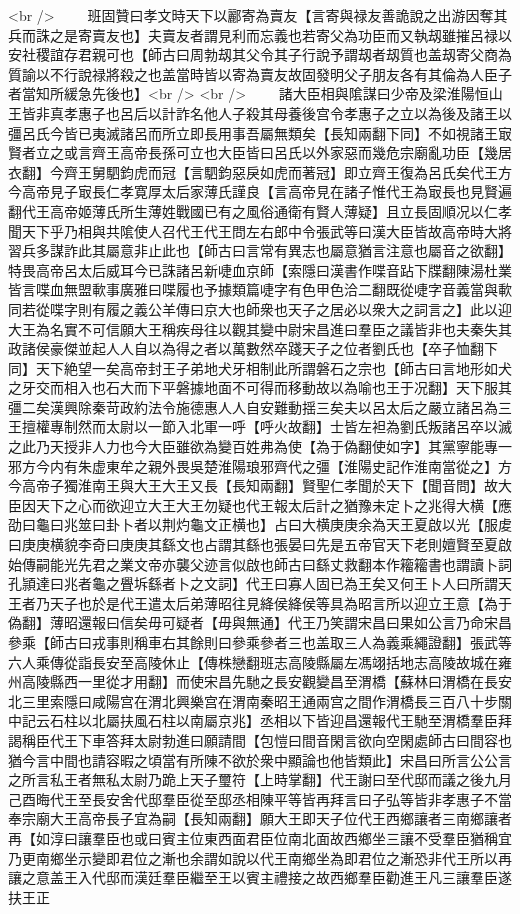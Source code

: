 <br />
　　班固贊曰孝文時天下以酈寄為賣友【言寄與禄友善詭說之出游因奪其兵而誅之是寄賣友也】夫賣友者謂見利而忘義也若寄父為功臣而又執刼雖摧呂禄以安社稷誼存君親可也【師古曰周勃刼其父令其子行說予謂刼者刼質也盖刼寄父商為質諭以不行說禄將殺之也盖當時皆以寄為賣友故固發明父子朋友各有其倫為人臣子者當知所緩急先後也】<br />
<br />
　　諸大臣相與隂謀曰少帝及梁淮陽恒山王皆非真孝惠子也呂后以計詐名他人子殺其母養後宫令孝惠子之立以為後及諸王以彊呂氏今皆已夷滅諸呂而所立即長用事吾屬無類矣【長知兩翻下同】不如視諸王㝡賢者立之或言齊王高帝長孫可立也大臣皆曰呂氏以外家惡而幾危宗廟亂功臣【幾居衣翻】今齊王舅駟鈞虎而冠【言駟鈞惡戾如虎而著冠】即立齊王復為呂氏矣代王方今高帝見子㝡長仁孝寛厚太后家薄氏謹良【言高帝見在諸子惟代王為㝡長也見賢遍翻代王高帝姬薄氏所生薄姓戰國已有之風俗通衛有賢人薄疑】且立長固順况以仁孝聞天下乎乃相與共隂使人召代王代王問左右郎中令張武等曰漢大臣皆故高帝時大將習兵多謀詐此其屬意非止此也【師古曰言常有異志也屬意猶言注意也屬音之欲翻】特畏高帝呂太后威耳今已誅諸呂新啑血京師【索隱曰漢書作喋音跕下牒翻陳湯杜業皆言喋血無盟㰱事廣雅曰喋履也予據類篇啑字有色甲色洽二翻既從啑字音義當與㰱同若從喋字則有履之義公羊傳曰京大也師衆也天子之居必以衆大之詞言之】此以迎大王為名實不可信願大王稱疾母往以觀其變中尉宋昌進曰羣臣之議皆非也夫秦失其政諸侯豪傑並起人人自以為得之者以萬數然卒踐天子之位者劉氏也【卒子恤翻下同】天下絶望一矣高帝封王子弟地犬牙相制此所謂磐石之宗也【師古曰言地形如犬之牙交而相入也石大而下平磐據地面不可得而移動故以為喻也王于况翻】天下服其彊二矣漢興除秦苛政約法令施德惠人人自安難動揺三矣夫以呂太后之嚴立諸呂為三王擅權專制然而太尉以一節入北軍一呼【呼火故翻】士皆左袒為劉氏叛諸呂卒以滅之此乃天授非人力也今大臣雖欲為變百姓弗為使【為于偽翻使如字】其黨寧能專一邪方今内有朱虚東牟之親外畏吳楚淮陽琅邪齊代之彊【淮陽史記作淮南當從之】方今高帝子獨淮南王與大王大王又長【長知兩翻】賢聖仁孝聞於天下【聞音問】故大臣因天下之心而欲迎立大王大王勿疑也代王報太后計之猶豫未定卜之兆得大横【應劭曰龜曰兆筮曰卦卜者以荆灼龜文正横也】占曰大横庚庚余為天王夏啟以光【服䖍曰庚庚横貌李奇曰庚庚其繇文也占謂其繇也張晏曰先是五帝官天下老則嬗賢至夏啟始傳嗣能光先君之業文帝亦襲父迹言似啟也師古曰繇丈救翻本作籕籕書也謂讀卜詞孔頴達曰兆者龜之舋坼繇者卜之文詞】代王曰寡人固已為王矣又何王卜人曰所謂天王者乃天子也於是代王遣太后弟薄昭往見絳侯絳侯等具為昭言所以迎立王意【為于偽翻】薄昭還報曰信矣毋可疑者【毋與無通】代王乃笑謂宋昌曰果如公言乃命宋昌參乘【師古曰戎事則稱車右其餘則曰參乘參者三也盖取三人為義乘繩證翻】張武等六人乘傳從詣長安至高陵休止【傳株戀翻班志高陵縣屬左馮翊括地志高陵故城在雍州高陵縣西一里從才用翻】而使宋昌先馳之長安觀變昌至渭橋【蘇林曰渭橋在長安北三里索隱曰咸陽宫在渭北興樂宫在渭南秦昭王通兩宫之間作渭橋長三百八十步關中記云石柱以北屬扶風石柱以南屬京兆】丞相以下皆迎昌還報代王馳至渭橋羣臣拜謁稱臣代王下車答拜太尉勃進曰願請間【包愷曰間音閑言欲向空閑處師古曰間容也猶今言中間也請容暇之頃當有所陳不欲於衆中顯論也他皆類此】宋昌曰所言公公言之所言私王者無私太尉乃跪上天子璽符【上時掌翻】代王謝曰至代邸而議之後九月己酉晦代王至長安舍代邸羣臣從至邸丞相陳平等皆再拜言曰子弘等皆非孝惠子不當奉宗廟大王高帝長子宜為嗣【長知兩翻】願大王即天子位代王西鄉讓者三南鄉讓者再【如淳曰讓羣臣也或曰賓主位東西面君臣位南北面故西鄉坐三讓不受羣臣猶稱宜乃更南鄉坐示變即君位之漸也余謂如說以代王南鄉坐為即君位之漸恐非代王所以再讓之意盖王入代邸而漢廷羣臣繼至王以賓主禮接之故西鄉羣臣勸進王凡三讓羣臣遂扶王正